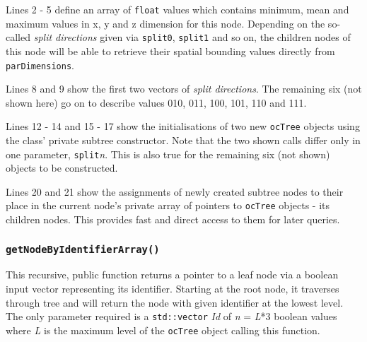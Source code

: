Lines 2 - 5 define an array of \texttt{float} values which contains minimum, mean and maximum values in x, y and z dimension for this node. Depending on the so-called \textit{split directions} given via \texttt{split0}, \texttt{split1} and so on, the children nodes of this node will be able to retrieve their spatial bounding values directly from \texttt{parDimensions}.

Lines 8 and 9 show the first two vectors of \textit{split directions}. The remaining six (not shown here) go on to describe values 010, 011, 100, 101, 110 and 111.

Lines 12 - 14 and 15 - 17 show the initialisations of two new \texttt{ocTree} objects using the class' private subtree constructor. Note that the two shown calls differ only in one parameter, \texttt{split}\textit{n}. This is also true for the remaining six (not shown) objects to be constructed.

Lines 20 and 21 show the assignments of newly created subtree nodes to their place in the current node's private array of pointers to \texttt{ocTree} objects - its children nodes. This provides fast and direct access to them for later queries. 

	\subsubsection{\texttt{getNodeByIdentifierArray()}}
	\label{set:getNodeByIdentifierArray}
This recursive, public function returns a pointer to a leaf node via a boolean input vector representing its identifier. Starting at the root node, it traverses through tree and will return the node with given identifier at the lowest level. The only parameter required is a \texttt{std::vector} \textit{Id} of \textit{n} = \textit{L}*3 boolean values where \textit{L} is the maximum level of the \texttt{ocTree} object calling this function.

